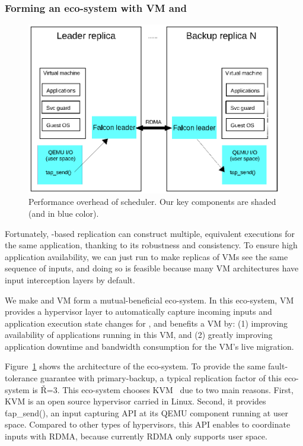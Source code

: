 \vspace{-.15in}\subsubsection{Forming an eco-system with VM and \falcon} 
\label{sec:vm-arch}\vspace{-.075in}

\begin{figure}[!htb]
\centering
\vspace{-.2in}
\includegraphics[width=0.34\textheight]{figures/vm_arch.ps}
        \vspace{-.3in}
        \caption{Performance overhead of scheduler. Our key components are 
shaded (and in blue color).}
        \label{fig:vm-arch}
\end{figure}

Fortunately, \paxos-based replication can construct multiple, equivalent 
executions for the same application, thanking to its robustness and 
consistency. To ensure high application availability, we can just run \paxos to 
make replicas of VMs see the same sequence of inputs, and doing so is feasible 
because many VM architectures have input interception layers by default.

We make \falcon and VM form a mutual-beneficial eco-system. In this eco-system, 
VM provides a hypervisor layer to automatically capture incoming inputs and 
application execution state changes for \falcon, and \falcon benefits a VM by: 
(1) improving availability of applications running in this VM, and (2) greatly 
improving application downtime and bandwidth consumption for the VM's live 
migration.

Figure~\ref{fig:vm-arch} shows the architecture of the eco-system. To provide 
the same fault-tolerance guarantee with primary-backup, a typical replication 
factor of this eco-system is \v{R=3}. This eco-system chooses KVM~\cite{kvm} 
due to two main reasons. First, KVM is an open source hypervisor carried in 
Linux. Second, it provides \v{tap\_send()}, an input capturing API at its QEMU 
component running at user space. Compared to other types of hypervisors, this 
API enables \falcon to coordinate inputs with RDMA, because currently RDMA only 
supports user space.

